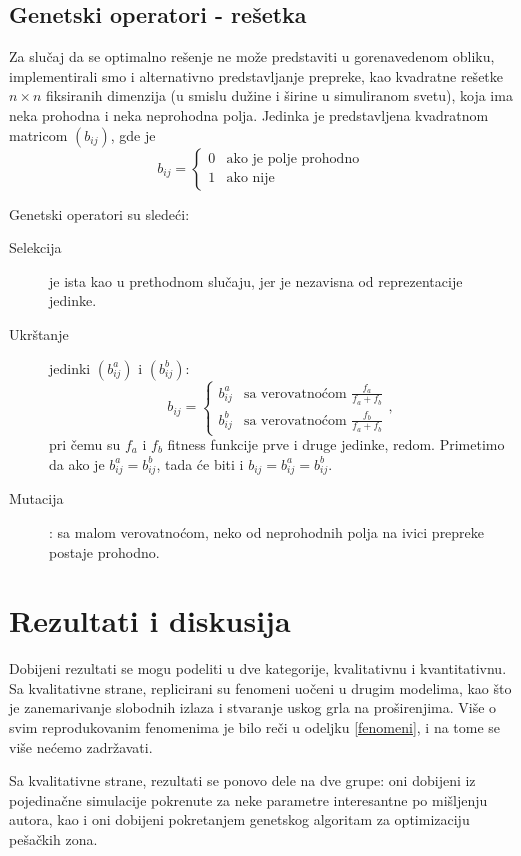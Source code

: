 \documentclass[12pt]{article}
\begin{document}
\subsection{Genetski operatori - rešetka}

Za slučaj da se optimalno rešenje ne može predstaviti u gorenavedenom obliku, implementirali smo i alternativno predstavljanje prepreke, kao kvadratne rešetke $n\times n$ fiksiranih dimenzija (u smislu dužine i širine u simuliranom svetu), koja ima neka prohodna i neka neprohodna polja. Jedinka je predstavljena kvadratnom matricom $(b_{ij})$, gde je
$$
b_{ij} = 
\begin{cases}
    0 & \text{ako je polje prohodno}\\
    1 & \text{ako nije}
\end{cases}
$$

Genetski operatori su sledeći:
\begin{description}
\item[Selekcija] je ista kao u prethodnom slučaju, jer je nezavisna od reprezentacije jedinke.
\item[Ukrštanje] jedinki $(b^a_{ij})$ i $(b^b_{ij})$:
$$
b_{ij} = 
\begin{cases}
    b^a_{ij} & \text{sa verovatnoćom } \frac{f_a}{f_a+f_b}\\
    b^b_{ij} & \text{sa verovatnoćom } \frac{f_b}{f_a+f_b}
\end{cases},
$$
pri čemu su $f_a$ i $f_b$ fitness funkcije prve i druge jedinke, redom. Primetimo da ako je $ b^a_{ij} = b^b_{ij}$, tada će biti i $b_{ij} = b^a_{ij} = b^b_{ij}$.
\item[Mutacija]: sa malom verovatnoćom, neko od neprohodnih polja na ivici prepreke postaje prohodno.
\end{description}

\section{Rezultati i diskusija}

Dobijeni rezultati se mogu podeliti u dve kategorije, kvalitativnu i kvantitativnu. Sa kvalitativne strane, replicirani su fenomeni uočeni u drugim modelima, kao što je zanemarivanje slobodnih izlaza i stvaranje uskog grla na proširenjima. Više o svim reprodukovanim fenomenima je bilo reči u odeljku \ref{fenomeni}, i na tome se više nećemo zadržavati.

Sa kvalitativne strane, rezultati se ponovo dele na dve grupe: oni dobijeni iz pojedinačne simulacije pokrenute za neke parametre interesantne po mišljenju autora, kao i oni dobijeni pokretanjem genetskog algoritam za optimizaciju pešačkih zona.
\end{document}
